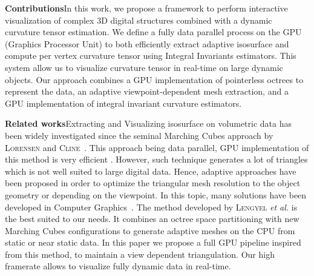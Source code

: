 \documentclass{llncs}
\begin{document}
\noindent\textbf{Contributions}\quad In this work, we propose a framework to
perform interactive visualization of complex 3D digital structures combined with
a dynamic curvature tensor estimation. We define a fully data
parallel process on the GPU (Graphics Processor Unit) to both efficiently
extract adaptive isosurface and compute per vertex curvature tensor using
Integral Invariants estimators. 
This system allow us to visualize
curvature tensor in real-time on large dynamic objects. Our approach combines a
GPU implementation of pointerless octrees to represent the data, an adaptive
viewpoint-dependent mesh extraction, and a GPU implementation of integral
invariant curvature estimators.


\vspace{0.2cm}

\sloppy\noindent\textbf{Related works}\quad Extracting and Visualizing
isosurface on volumetric data has been widely investigated since the
seminal Marching Cubes approach by \textsc{Lorensen} and
\textsc{Cline}~\cite{lorensen1987marching}. This approach being data parallel,
GPU implementation of this method is very efficient
\cite{tatarchuk2007real}. However, such technique generates a lot of
triangles which is not well suited to large digital data. Hence,
adaptive approaches have been proposed in order to optimize the
triangular mesh resolution to the object geometry or depending on the
viewpoint. In this topic, many solutions have been developed in
Computer
Graphics~\cite{shu1995adaptive,schaefer2004dual,lengyel2010voxel,DBLP:journals/cgf/LewinerMPPL10,DBLP:journals/cvgip/LobelloDD14}.
The method developed by \textsc{Lengyel} \textit{et al.}
\cite{lengyel2010voxel} is the best suited to our needs.
It combines an octree space partitioning with new Marching Cubes configurations
to generate adaptive meshes on the CPU from 
static or near static data.
In this paper we propose a full GPU pipeline
inspired from this method, 
to maintain a view dependent triangulation.
Our high framerate allows to visualize fully dynamic data in real-time.
\end{document}
